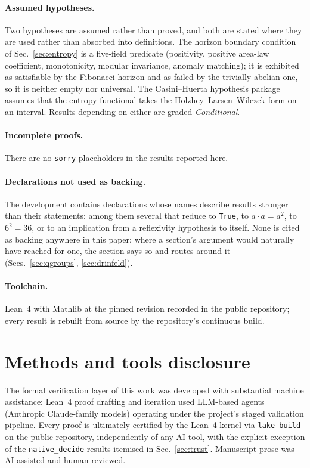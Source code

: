 \documentclass[aps,prx,nofootinbib,superscriptaddress,12pt]{revtex4-2}
\begin{document}
\paragraph{Assumed hypotheses.}
Two hypotheses are assumed rather than proved, and both are stated where
they are used rather than absorbed into definitions. The horizon
boundary condition of Sec.~\ref{sec:entropy} is a five-field predicate
(positivity, positive area-law coefficient, monotonicity, modular
invariance, anomaly matching); it is exhibited as satisfiable by the
Fibonacci horizon and as failed by the trivially abelian one, so it is
neither empty nor universal. The Casini--Huerta hypothesis package
assumes that the entropy functional takes the
Holzhey--Larsen--Wilczek form on an interval. Results depending on
either are graded \emph{Conditional}.

\paragraph{Incomplete proofs.}
There are no \texttt{sorry} placeholders in the results reported here.

\paragraph{Declarations not used as backing.}
The development contains declarations whose names describe results
stronger than their statements: among them several that reduce to
\texttt{True}, to $a\cdot a = a^2$, to $6^2 = 36$, or to an implication
from a reflexivity hypothesis to itself. None is cited as backing
anywhere in this paper; where a section's argument would naturally have
reached for one, the section says so and routes around it
(Secs.~\ref{sec:qgroups}, \ref{sec:drinfeld}).

\paragraph{Toolchain.}
Lean~4 with Mathlib at the pinned revision recorded in the public
repository; every result is rebuilt from source by the repository's
continuous build.

\section*{Methods and tools disclosure}
The formal verification layer of this work was developed with
substantial machine assistance: Lean~4 proof drafting and iteration
used LLM-based agents (Anthropic Claude-family models) operating under
the project's staged validation pipeline. Every proof is ultimately
certified by the Lean~4 kernel via \texttt{lake build} on the public
repository, independently of any AI tool, with the explicit exception of
the \texttt{native\_decide} results itemised in
Sec.~\ref{sec:trust}. Manuscript prose was AI-assisted and
human-reviewed.
\end{document}
